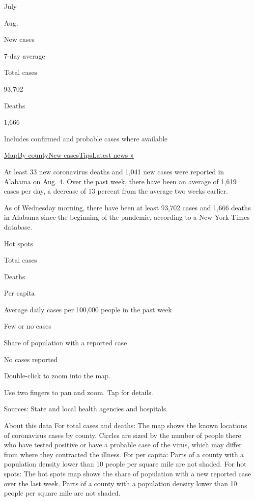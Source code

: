 July

Aug.

New cases

7-day average

Total cases

93,702

Deaths

1,666

Includes confirmed and probable cases where available

\protect\hyperlink{map}{Map}\protect\hyperlink{county}{By
county}\protect\hyperlink{cases}{New
cases}\protect\hyperlink{tips}{Tips}\href{https://www.nytimes.com/2020/08/04/world/coronavirus-covid-19.html}{Latest
news »}

At least 33 new coronavirus deaths and 1,041 new cases were reported in
Alabama on Aug. 4. Over the past week, there have been an average of
1,619 cases per day, a decrease of 13 percent from the average two weeks
earlier.

As of Wednesday morning, there have been at least 93,702 cases and 1,666
deaths in Alabama since the beginning of the pandemic, according to a
New York Times database.

Hot spots

Total cases

Deaths

Per capita

Average daily cases per 100,000 people in the past week

Few or no cases

Share of population with a reported case

No cases reported

Double-click to zoom into the map.

Use two fingers to pan and zoom. Tap for details.

Sources: State and local health agencies and hospitals.

About this data For total cases and deaths: The map shows the known
locations of coronavirus cases by county. Circles are sized by the
number of people there who have tested positive or have a probable case
of the virus, which may differ from where they contracted the illness.
For per capita: Parts of a county with a population density lower than
10 people per square mile are not shaded. For hot spots: The hot spots
map shows the share of population with a new reported case over the last
week. Parts of a county with a population density lower than 10 people
per square mile are not shaded.

